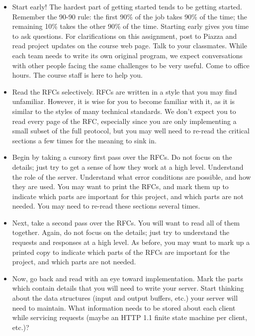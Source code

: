 \documentclass[12pt]{article}
\begin{document}
\begin{itemize}

\item Start early! The hardest part of getting started tends to be
getting started. Remember the 90-90 rule: the first 90\% of the job
takes 90\% of the time; the remaining 10\% takes the other 90\% of the
time. Starting early gives you time to ask questions. For clarifications
on this assignment, post to Piazza and read project updates on the course
web page. Talk to your classmates. While each team needs to write its
own original program, we expect conversations with other people facing
the same challenges to be very useful.  Come to office hours. The course
staff is here to help you.

\item Read the RFCs selectively. RFCs are written in a style that you may
find unfamiliar. However, it is wise for you to become familiar with it,
as it is similar to the styles of many technical standards. We don’t
expect you to read every page of the RFC, especially since you are only
implementing a small subset of the full protocol, but you may well need
to re-read the critical sections a few times for the meaning to sink in.

\item Begin by taking a cursory first pass over the RFCs. Do not
focus on the details; just try to get a sense of how they work at a
high level. Understand the role of the server. Understand what error
conditions are possible, and how they are used. You may want to print
the RFCs, and mark them up to indicate which parts are important for
this project, and which parts are not needed. You may need to re-read
these sections several times.

\item Next, take a second pass over the RFCs. You will want to read
all of them together. Again, do not focus on the details; just try to
understand the requests and responses at a high level. As before, you
may want to mark up a printed copy to indicate which parts of the RFCs
are important for the project, and which parts are not needed.

\item Now, go back and read with an eye toward implementation. Mark the
parts which contain details that you will need to write your server. Start
thinking about the data structures (input and output buffers, etc.) your
server will need to maintain. What information needs to be stored about
each client while servicing requests (maybe an HTTP 1.1 finite state
machine per client, etc.)?


\end{itemize}
\end{document}
